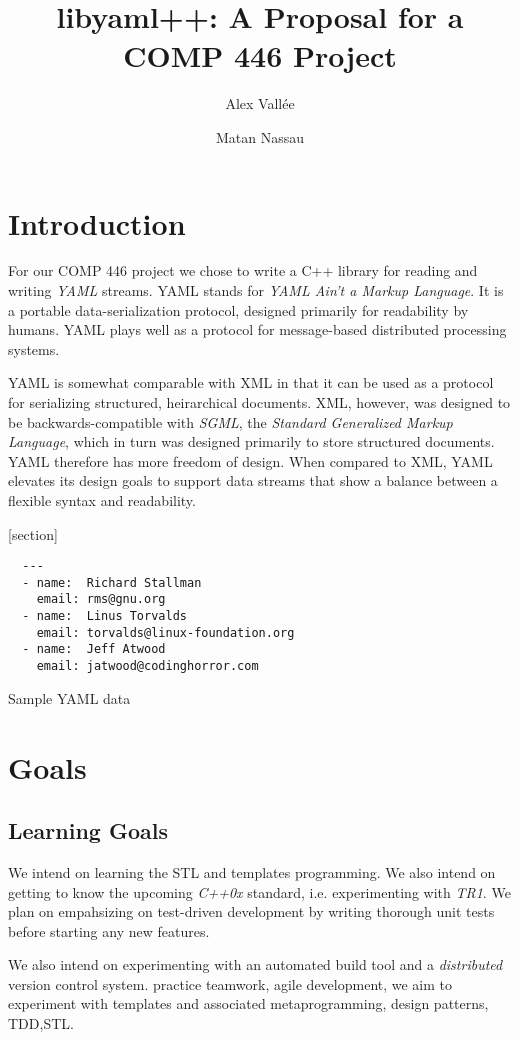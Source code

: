 \documentclass{article}
\author{Alex Vall\'ee \and Matan Nassau}
\title{libyaml++:  A Proposal for a COMP 446 Project}
\begin{document}
\maketitle

\section{Introduction}
For our COMP 446 project we chose to write a C++ library for reading and writing \emph{YAML} streams.  YAML stands for \emph{YAML Ain't a Markup Language}.  It is a portable data-serialization protocol, designed primarily for readability by humans.  YAML plays well as a protocol for message-based distributed processing systems.

YAML is somewhat comparable with XML in that it can be used as a protocol for serializing structured, heirarchical documents.  XML, however, was designed to be backwards-compatible with \emph{SGML}, the \emph{Standard Generalized Markup Language}, which in turn was designed primarily to store structured documents.  YAML therefore has more freedom of design.  When compared to XML, YAML elevates its design goals to support data streams that show a balance between a flexible syntax and readability.

[section]
\begin{Figure}
  \begin{verbatim}
  ---
  - name:  Richard Stallman
    email: rms@gnu.org
  - name:  Linus Torvalds
    email: torvalds@linux-foundation.org
  - name:  Jeff Atwood
    email: jatwood@codinghorror.com
  \end{verbatim}
  \caption{Sample YAML data}
\end{Figure}

\section{Goals}

\subsection{Learning Goals}
We intend on learning the STL and templates programming. We also intend on getting to know the upcoming \emph{C++0x} standard, i.e. experimenting with \emph{TR1}.  We plan on empahsizing on test-driven development by writing thorough unit tests before starting any new features.

We also intend on experimenting with an automated build tool and a \emph{distributed} version control system.  practice teamwork, agile development, we aim to experiment with templates and associated metaprogramming, design patterns, TDD,STL.
\end{document}
